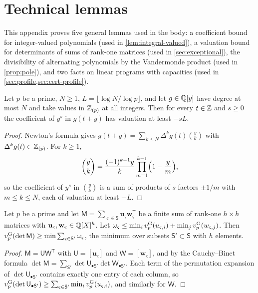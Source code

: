 \section{Technical lemmas}\label{app:technical}

This appendix proves five general lemmas used in the body: a coefficient bound for integer-valued polynomials (used in \cref{lem:integral-valued}), a valuation bound for determinants of sums of rank-one matrices (used in \cref{sec:exceptional}), the divisibility of alternating polynomials by the Vandermonde product (used in \cref{prop:pole}), and two facts on linear programs with capacities (used in \cref{sec:profile,sec:cert-profile}).

\begin{lemma}\label{lem:integer-valued-coefficients}
Let $p$ be a prime, $N\ge1$, $L=\lfloor\log N/\log p\rfloor$, and let $g\in\mathbb{Q}[y]$ have degree at most $N$ and take values in $\mathbb{Z}_{(p)}$ at all integers. Then for every $t\in\mathbb{Z}$ and $s\ge0$ the coefficient of $y^s$ in $g(t+y)$ has valuation at least $-sL$.
\end{lemma}

\begin{proof}
Newton's formula gives $g(t+y)=\sum_{k\le N}\Delta^kg(t)\binom yk$ with $\Delta^kg(t)\in\mathbb{Z}_{(p)}$. For $k\ge1$,
\[
\binom yk=\frac{(-1)^{k-1}y}{k}\prod_{m=1}^{k-1}\Bigl(1-\frac ym\Bigr),
\]
so the coefficient of $y^s$ in $\binom yk$ is a sum of products of $s$ factors $\pm1/m$ with $m\le k\le N$, each of valuation at least $-L$.
\end{proof}

\begin{lemma}\label{lem:slots}
Let $p$ be a prime and let $\mathsf M=\sum_{\varsigma\in\mathsf S}\mathbf u_\varsigma\mathbf w_\varsigma^{\mathsf T}$ be a finite sum of rank-one $h\times h$ matrices with $\mathbf u_\varsigma,\mathbf w_\varsigma\in\mathbb{Q}[X]^h$. Let $\omega_\varsigma\le\min_iv^{\mathrm{G}}_{p}(u_{\varsigma,i})+\min_jv^{\mathrm{G}}_{p}(w_{\varsigma,j})$. Then $v^{\mathrm{G}}_{p}(\det\mathsf M)\ge\min\sum_{\varsigma\in\mathsf S'}\omega_\varsigma$, the minimum over subsets $\mathsf S'\subset\mathsf S$ with $h$ elements.
\end{lemma}

\begin{proof}
$\mathsf M=\mathsf U\mathsf W^{\mathsf T}$ with $\mathsf U=[\mathbf u_\varsigma]$ and $\mathsf W=[\mathbf w_\varsigma]$, and by the Cauchy--Binet formula $\det\mathsf M=\sum_{\mathsf S'}\det\mathsf U_{\bullet\mathsf S'}\det\mathsf W_{\bullet\mathsf S'}$. Each term of the permutation expansion of $\det\mathsf U_{\bullet\mathsf S'}$ contains exactly one entry of each column, so $v^{\mathrm{G}}_{p}(\det\mathsf U_{\bullet\mathsf S'})\ge\sum_{\varsigma\in\mathsf S'}\min_iv^{\mathrm{G}}_{p}(u_{\varsigma,i})$, and similarly for $\mathsf W$.
\end{proof}

